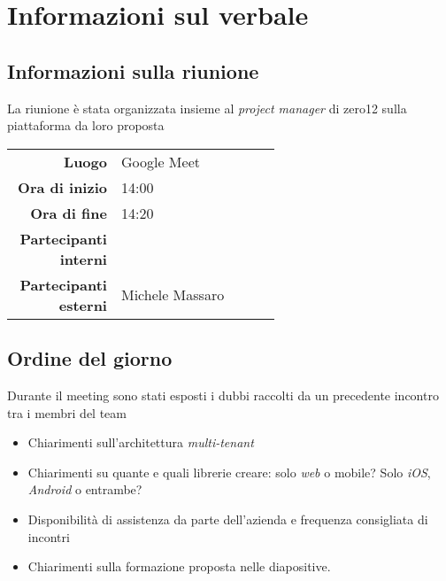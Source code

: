 \section{Informazioni sul verbale}

\subsection{Informazioni sulla riunione}
La riunione è stata organizzata insieme al \textit{project manager} di zero12 sulla piattaforma da loro proposta

\begin{center}
	\begin{tabular}{r|p{0.6\linewidth}}
		\toprule
		\textbf{Luogo} & Google Meet \\
		\textbf{Ora di inizio} & 14:00 \\
		\textbf{Ora di fine} & 14:20 \\
		\textbf{Partecipanti interni} & \groupTeam \\
		\textbf{Partecipanti esterni} & Michele Massaro
	\end{tabular}
\end{center}

\medskip

\subsection{Ordine del giorno}
Durante il meeting sono stati esposti i dubbi raccolti da un precedente incontro tra i membri del team
\begin{itemize}
	\item Chiarimenti sull'architettura \emph{multi-tenant}
	\item Chiarimenti su quante e quali librerie creare: solo \textit{web} o mobile? Solo \textit{iOS}, \textit{Android} o entrambe?
	\item Disponibilità di assistenza da parte dell'azienda e frequenza consigliata di incontri
	\item Chiarimenti sulla formazione proposta nelle diapositive.
\end{itemize}
